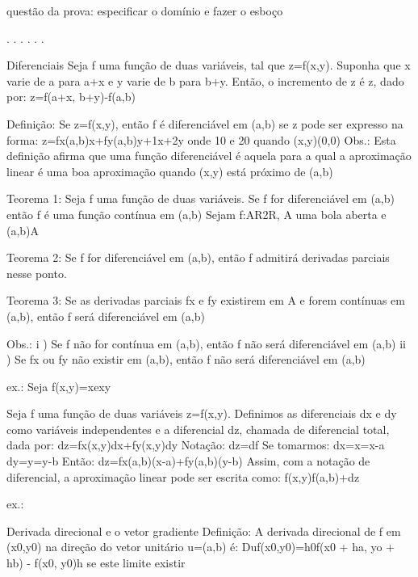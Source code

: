 {{{questão da prova: especificar o domínio e fazer o esboço

   . . . . . .


Diferenciais
Seja f uma função de duas variáveis, tal que z=f(x,y). Suponha que x varie de a para a+x e y varie de b para b+y. Então, o incremento de z é z, dado por:
    z=f(a+x, b+y)-f(a,b)

Definição:
    Se z=f(x,y), então f é diferenciável em (a,b) se z pode ser expresso na forma:
        z=fx(a,b)x+fy(a,b)y+1x+2y
    onde 10 e 20 quando (x,y)(0,0)
    Obs.: Esta definição afirma que uma função diferenciável é aquela para a qual a aproximação linear é uma 
              boa aproximação quando (x,y) está próximo de (a,b)



Teorema 1:
    Seja f uma função de duas variáveis. Se f for diferenciável em (a,b) então f é uma função contínua em (a,b)
    Sejam f:AR2R, A uma bola aberta e (a,b)A

Teorema 2:
    Se f for diferenciável em (a,b), então f admitirá derivadas parciais nesse ponto.

Teorema 3:
    Se as derivadas parciais fx e fy existirem em A e forem contínuas em (a,b), então f será diferenciável em (a,b)

Obs.:
    i ) Se f não for contínua em (a,b), então f não será diferenciável em (a,b)
    ii ) Se fx ou fy não existir em (a,b), então f não será diferenciável em (a,b)

ex.: Seja f(x,y)=xexy
















Seja f uma função de duas variáveis z=f(x,y). Definimos as diferenciais dx e dy como variáveis independentes e a diferencial dz, chamada de diferencial total, dada por:
    dz=fx(x,y)dx+fy(x,y)dy
Notação: dz=df
Se tomarmos:
    dx=x=x-a
    dy=y=y-b
Então:
    dz=fx(a,b)(x-a)+fy(a,b)(y-b)
Assim, com a notação de diferencial, a aproximação linear pode ser escrita como:
    f(x,y)f(a,b)+dz

ex.:






Derivada direcional e o vetor gradiente
Definição:
    A derivada direcional de f em (x0,y0) na direção do vetor unitário u=(a,b) é:
            Duf(x0,y0)=h0f(x0 + ha, yo + hb) - f(x0, y0)h
    se este limite existir

}}}
